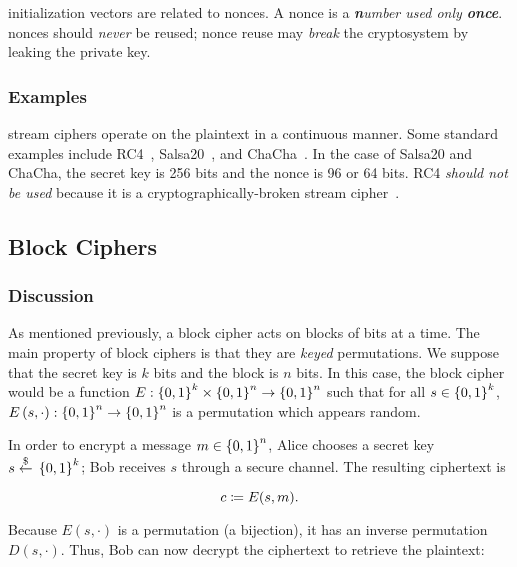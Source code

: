 \Glspl{initialization vector} are related to \glspl{nonce}.
A \gls{nonce} is a \emph{\textbf{n}umber used only \textbf{once}}.
\Glspl{nonce} should \emph{never} be reused;
\gls{nonce} reuse may \emph{break} the cryptosystem by leaking the private key.

\subsubsection{Examples}

\Glspl{stream cipher} operate on the plaintext in a continuous manner.
Some standard examples include RC4~\cite{rivest2016spritz},
Salsa20~\cite{salsa20}, and ChaCha~\cite{chacha}.
In the case of Salsa20 and ChaCha, the secret key is 256 bits
and the \gls{nonce} is 96 or 64 bits.
RC4 \emph{should not be used} because it is a cryptographically-broken
\gls{stream cipher}~\cite{rfc7465,rivest2016spritz}.


\subsection{Block Ciphers}

\subsubsection{Discussion}

As mentioned previously, a \gls{block cipher} acts on blocks of bits
at a time.
The main property of \glspl{block cipher} is that they are
\emph{keyed} \glspl{permutation}.
We suppose that the secret key is $k$ bits and the block is $n$ bits.
In this case, the \gls{block cipher} would be a function
$E:\left\{ 0,1 \right\}^{k}\times\left\{ 0,1 \right\}^{n}\to\left\{ 0,1 \right\}^{n}$
such that for all $s\in\left\{ 0,1 \right\}^{k}$,
$E\left( s,\cdot \right):\left\{ 0,1 \right\}^{n}\to\left\{ 0,1 \right\}^{n}$
is a \gls{permutation} which appears random.

In order to encrypt a message $m\in\left\{ 0,1 \right\}^{n}$,
Alice chooses a secret key $s\stackrel{\$}{\leftarrow}{}\left\{ 0,1 \right\}^{k}$;
Bob receives $s$ through a \gls{secure channel}.
The resulting ciphertext is

\begin{equation}
    c \coloneqq{} E(s,m).
\end{equation}

\noindent
Because $E(s,\cdot)$ is a \gls{permutation} (a bijection),
it has an inverse permutation $D(s,\cdot)$.
Thus, Bob can now decrypt the ciphertext to retrieve the plaintext:


